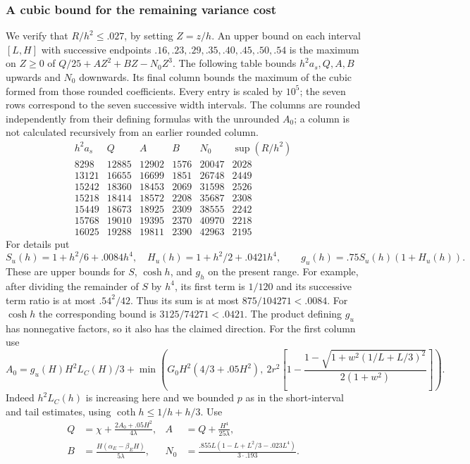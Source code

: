 \subsubsection{A cubic bound for the remaining variance cost}
We verify that \(R/h^2\le .027\), by setting \(Z=z/h\). An upper bound on each interval \([L,H]\) with successive endpoints \(.16,.23,.29,.35,.40,.45,.50,.54\) is the maximum on \(Z\ge0\) of \(Q/25+A Z^2+B Z-N_0 Z^3\). The following table bounds $h^2a_s,Q,A,B$ upwards and $N_0$ downwards.
Its final column bounds the maximum of the cubic formed from those
rounded coefficients. Every entry is scaled by $10^5$; the seven rows
correspond to the seven successive width intervals. The columns are
rounded independently from their defining formulas with the unrounded
$A_0$; a column is not calculated recursively from an earlier rounded
column.
\[
\begin{array}{rrrrrr}
 h^2a_s&Q&A&B&N_0&\sup(R/h^2)\\\hline
8298&12885&12902&1576&20047&2028\\
13121&16655&16699&1851&26748&2449\\
15242&18360&18453&2069&31598&2526\\
15218&18414&18572&2208&35687&2308\\
15449&18673&18925&2309&38555&2242\\
15768&19010&19395&2370&40970&2218\\
16025&19288&19811&2390&42963&2195
\end{array}
\]
For details put
\[
 S_u(h)=1+h^2/6+.0084h^4,\quad H_u(h)=1+h^2/2+.0421h^4,\qquad
 g_u(h)=.75 S_u(h)(1+H_u(h)).
\]
These are upper bounds for $S$, $\cosh h$, and $g_h$ on the present range.
For example, after dividing the remainder of $S$ by $h^4$, its first
term is $1/120$ and its successive term ratio is at most $.54^2/42$.
Thus its sum is at most $875/104271<.0084$. For $\cosh h$ the
corresponding bound is $3125/74271<.0421$. The product defining $g_u$
has nonnegative factors, so it also has the claimed direction. For the first column use
\[
 A_0=g_u(H)H^2L_C(H)/3+
 \min\left(G_0 H^2(4/3+.05H^2),\ 2r^2\left[1-\frac{1-\sqrt{1+w^2(1/L+L/3)^2}}{2(1+w^2)}\right]\right).
\]
Indeed \(h^2L_C(h)\) is increasing here and we bounded \(p\) as in the short-interval and tail estimates, using \(\coth h\le1/h+h/3\). Use
\[
\begin{aligned}
 Q&=\chi+\frac{2A_0+.05H^2}{4\lambda},&
 A&=Q+\frac{H^4}{25\lambda},\\
 B&=\frac{H(\alpha_E-\beta_EH)}{5\lambda},&
 N_0&=\frac{.855L(1-L+L^2/3-.023L^4)}{3\cdot.193}.
\end{aligned}
\]
